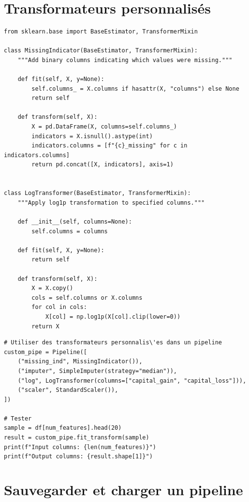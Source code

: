 \section{Transformateurs personnalis\'es}

\begin{verbatim}
from sklearn.base import BaseEstimator, TransformerMixin

class MissingIndicator(BaseEstimator, TransformerMixin):
    """Add binary columns indicating which values were missing."""

    def fit(self, X, y=None):
        self.columns_ = X.columns if hasattr(X, "columns") else None
        return self

    def transform(self, X):
        X = pd.DataFrame(X, columns=self.columns_)
        indicators = X.isnull().astype(int)
        indicators.columns = [f"{c}_missing" for c in indicators.columns]
        return pd.concat([X, indicators], axis=1)


class LogTransformer(BaseEstimator, TransformerMixin):
    """Apply log1p transformation to specified columns."""

    def __init__(self, columns=None):
        self.columns = columns

    def fit(self, X, y=None):
        return self

    def transform(self, X):
        X = X.copy()
        cols = self.columns or X.columns
        for col in cols:
            X[col] = np.log1p(X[col].clip(lower=0))
        return X
\end{verbatim}

\begin{verbatim}
# Utiliser des transformateurs personnalis\'es dans un pipeline
custom_pipe = Pipeline([
    ("missing_ind", MissingIndicator()),
    ("imputer", SimpleImputer(strategy="median")),
    ("log", LogTransformer(columns=["capital_gain", "capital_loss"])),
    ("scaler", StandardScaler()),
])

# Tester
sample = df[num_features].head(20)
result = custom_pipe.fit_transform(sample)
print(f"Input columns: {len(num_features)}")
print(f"Output columns: {result.shape[1]}")
\end{verbatim}

\section{Sauvegarder et charger un pipeline}

